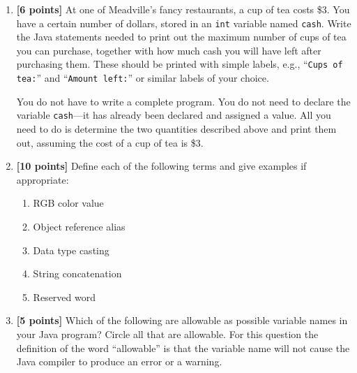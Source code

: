 \documentclass[11pt]{report}
\begin{document}
\begin{enumerate}
\vspace{2in}
\newpage

\item {\bf [6 points]}
At one of Meadville's fancy restaurants, a cup of tea costs
\$3. You have a certain number of dollars, stored in an {\tt int}
variable named {\tt cash}. Write the Java statements needed to
print out the maximum number of cups of tea you can purchase,
together with how much cash you will have left after purchasing them.
These should be printed with simple labels, e.g., ``{\tt Cups of tea:}'' 
and ``{\tt Amount left:}'' or similar labels of your choice.

You do not have to write a complete program. You do not need to declare
the variable {\tt cash}---it has already been declared and assigned a
value. All you need to do is determine the two quantities described
above and print them out,
assuming the cost of a cup of tea is \$3.

\vspace{3in}

\item {\bf [10 points]}
Define each of the following terms and give examples if appropriate:
\begin{enumerate}
\item RGB color value 

\bigskip
\bigskip
\bigskip
\item Object reference alias

\bigskip
\bigskip
\bigskip

\item Data type casting

\bigskip
\bigskip
\bigskip

\item String concatenation 
\bigskip
\bigskip
\bigskip

\item Reserved word 
\bigskip
\bigskip
\bigskip

\end{enumerate}

\item {\bf [5 points]}
Which of the following are allowable as possible variable names in your Java program? Circle all that are allowable.
For this question the definition of the word ``allowable'' is that the variable name will not cause the Java compiler to produce an
error or a warning.


\end{enumerate}
\end{document}
